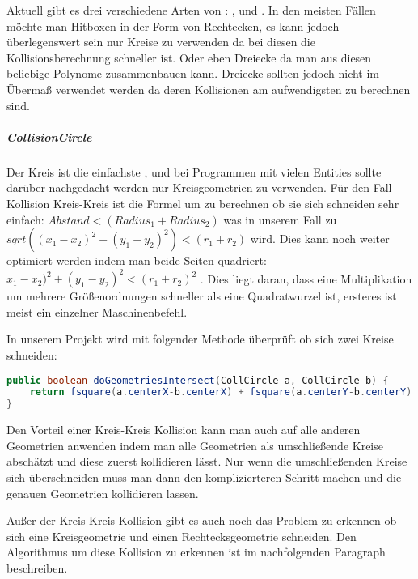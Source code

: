 Aktuell gibt es drei verschiedene Arten von : ,  und . In den meisten Fällen möchte man Hitboxen in der Form von Rechtecken, es kann jedoch überlegenswert sein nur Kreise zu verwenden da bei diesen die Kollisionsberechnung schneller ist. Oder eben Dreiecke da man aus diesen beliebige Polynome zusammenbauen kann. Dreiecke sollten jedoch nicht im Übermaß verwendet werden da deren Kollisionen am aufwendigsten zu berechnen sind.

\subparagraph{CollisionCircle}

Der Kreis ist die einfachste , und bei Programmen mit vielen Entities sollte darüber nachgedacht werden nur Kreisgeometrien zu verwenden.
Für den Fall Kollision Kreis-Kreis ist die Formel um zu berechnen ob sie sich schneiden sehr einfach:
$ Abstand < (Radius_1 + Radius_2) $ was in unserem Fall zu $ sqrt((x_1 - x_2)^2 + (y_1 - y_2)^2) < (r_1 + r_2)$ wird. Dies kann noch weiter optimiert werden indem man beide Seiten quadriert: $ x_1 - x_2)^2 + (y_1 - y_2)^2 < (r_1 + r_2)^2 $ \cite[S 499]{DGIJ}. Dies liegt daran, dass eine Multiplikation um mehrere Größenordnungen schneller als eine Quadratwurzel ist, ersteres ist meist ein einzelner Maschinenbefehl.

In unserem Projekt wird mit folgender Methode überprüft ob sich zwei Kreise schneiden:

\doinline
\begin{lstlisting}[caption=Erkennen von Kollisionen (Kreis-Kreis), title=\hspace{0 pt}, language=java]
public boolean doGeometriesIntersect(CollCircle a, CollCircle b) {
	return fsquare(a.centerX-b.centerX) + fsquare(a.centerY-b.centerY) < fsquare(a.radius + b.radius);
}
\end{lstlisting}

Den Vorteil einer Kreis-Kreis Kollision kann man auch auf alle anderen Geometrien anwenden indem man alle Geometrien als umschließende Kreise abschätzt und diese zuerst kollidieren lässt. Nur wenn die umschließenden Kreise sich überschneiden muss man dann den komplizierteren Schritt machen und die genauen Geometrien kollidieren lassen.

Außer der Kreis-Kreis Kollision gibt es auch noch das Problem zu erkennen ob sich eine Kreisgeometrie und einen Rechtecksgeometrie schneiden.
Den Algorithmus um diese Kollision zu erkennen ist im nachfolgenden Paragraph  beschreiben.

